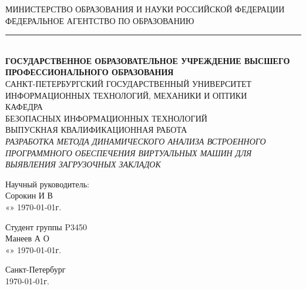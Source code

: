 \begin{titlepage}
	\newpage

	\begin{center}
		\newlength{\HeadLength}
		\settowidth{\HeadLength}{МИНИСТЕРСТВО ОБРАЗОВАНИЯ И НАУКИ РОССИЙСКОЙ ФЕДЕРАЦИИ}
		МИНИСТЕРСТВО ОБРАЗОВАНИЯ И НАУКИ РОССИЙСКОЙ ФЕДЕРАЦИИ\\
		ФЕДЕРАЛЬНОЕ АГЕНТСТВО ПО ОБРАЗОВАНИЮ\\
		\rule{\HeadLength}{0.4mm}\\
		{\fontsize{8pt}{10}
			\selectfont \textbf{ГОСУДАРСТВЕННОЕ ОБРАЗОВАТЕЛЬНОЕ УЧРЕЖДЕНИЕ ВЫСШЕГО ПРОФЕССИОНАЛЬНОГО ОБРАЗОВАНИЯ}\\
		}
		\vspace{1.0cm}
		САНКТ-ПЕТЕРБУРГСКИЙ ГОСУДАРСТВЕННЫЙ УНИВЕРСИТЕТ\\
		ИНФОРМАЦИОННЫХ ТЕХНОЛОГИЙ, МЕХАНИКИ И ОПТИКИ\\
		\vspace{1.5cm}
		КАФЕДРА\\
		БЕЗОПАСНЫХ ИНФОРМАЦИОННЫХ ТЕХНОЛОГИЙ\\
		\vspace{2.5cm}
		\Large{ВЫПУСКНАЯ КВАЛИФИКАЦИОННАЯ РАБОТА}\\
		\vspace{1.0cm}
		\textsc{\textit{
		РАЗРАБОТКА МЕТОДА ДИНАМИЧЕСКОГО АНАЛИЗА ВСТРОЕННОГО ПРОГРАММНОГО ОБЕСПЕЧЕНИЯ ВИРТУАЛЬНЫХ МАШИН ДЛЯ ВЫЯВЛЕНИЯ ЗАГРУЗОЧНЫХ ЗАКЛАДОК
		}}
		\\
	\end{center}

	\vspace{\fill}

	\newlength{\ML}

	\hfill\begin{minipage}{0.45\textwidth}
	Научный руководитель:\\
	\underline{\hspace{\ML}}
	Сорокин И В
	\\
	«\underline{\hspace{0.7cm}}» \underline{\hspace{2cm}} \CurrentYear\today г.
	\end{minipage}%
	\bigskip

	\hfill\begin{minipage}{0.45\textwidth}
	Студент группы 
		P3450
	\\
	\underline{\hspace{\ML}}
		Манеев А О
	\\
	«\underline{\hspace{0.7cm}}» \underline{\hspace{2cm}} \CurrentYear\today г.
	\end{minipage}%

	\vspace{2.5cm}

	\begin{center}
	Санкт-Петербург\\
	\CurrentYear\today г.
	\end{center}
	\newpage

\end{titlepage}
